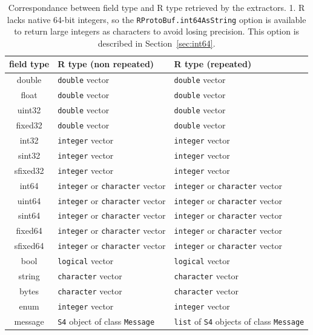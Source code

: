 \documentclass[article]{jss}
\begin{document}
\begin{table}[h]
\centering
\begin{small}
\begin{tabular}{|c|p{5cm}p{5cm}|}
\hline
field type & R type (non repeated) & R type (repeated) \\
\hline
\hline
double	& \texttt{double} vector & \texttt{double} vector \\
float	& \texttt{double} vector & \texttt{double} vector \\
\hline
uint32	  & \texttt{double} vector & \texttt{double} vector \\
fixed32	  & \texttt{double} vector & \texttt{double} vector \\
\hline
int32	  & \texttt{integer} vector & \texttt{integer} vector \\
sint32	  & \texttt{integer} vector & \texttt{integer} vector \\
sfixed32  & \texttt{integer} vector & \texttt{integer} vector \\
\hline
int64	  & \texttt{integer} or \texttt{character}
vector \footnotemark & \texttt{integer} or \texttt{character} vector \\
uint64	  & \texttt{integer} or \texttt{character} vector & \texttt{integer} or \texttt{character} vector \\
sint64	  & \texttt{integer} or \texttt{character} vector & \texttt{integer} or \texttt{character} vector \\
fixed64	  & \texttt{integer} or \texttt{character} vector & \texttt{integer} or \texttt{character} vector \\
sfixed64  & \texttt{integer} or \texttt{character} vector & \texttt{integer} or \texttt{character} vector \\
\hline
bool	& \texttt{logical} vector & \texttt{logical} vector \\
\hline
string	& \texttt{character} vector & \texttt{character} vector \\
bytes	& \texttt{character} vector & \texttt{character} vector \\
\hline
enum & \texttt{integer} vector & \texttt{integer} vector \\
\hline
message & \texttt{S4} object of class \texttt{Message} & \texttt{list} of \texttt{S4} objects of class \texttt{Message} \\
\hline
\end{tabular}
\end{small}
\caption{\label{table-get-types}Correspondance between field type and
  R type retrieved by the extractors. \footnotesize{1. R lacks native
  64-bit integers, so the \texttt{RProtoBuf.int64AsString} option is
  available to return large integers as characters to avoid losing
  precision.  This option is described in Section~\ref{sec:int64}}.}
\end{table}
\end{document}
